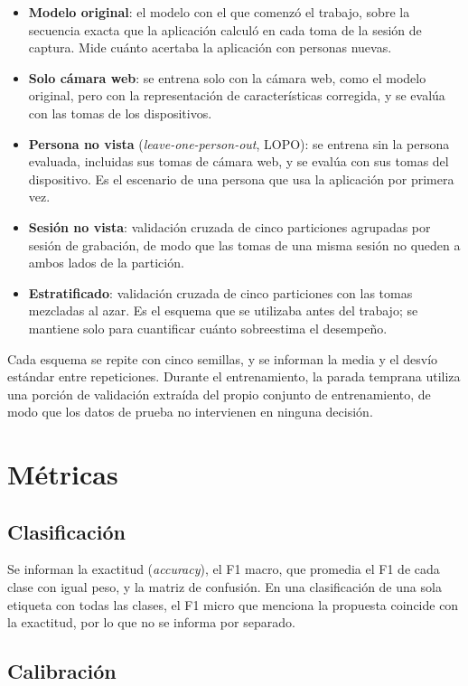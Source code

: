 \begin{itemize}
    \item \textbf{Modelo original}: el modelo con el que comenzó el trabajo, sobre la secuencia exacta que la aplicación calculó en cada toma de la sesión de captura. Mide cuánto acertaba la aplicación con personas nuevas.
    \item \textbf{Solo cámara web}: se entrena solo con la cámara web, como el modelo original, pero con la representación de características corregida, y se evalúa con las tomas de los dispositivos.
    \item \textbf{Persona no vista} (\emph{leave-one-person-out}, LOPO): se entrena sin la persona evaluada, incluidas sus tomas de cámara web, y se evalúa con sus tomas del dispositivo. Es el escenario de una persona que usa la aplicación por primera vez.
    \item \textbf{Sesión no vista}: validación cruzada de cinco particiones agrupadas por sesión de grabación, de modo que las tomas de una misma sesión no queden a ambos lados de la partición.
    \item \textbf{Estratificado}: validación cruzada de cinco particiones con las tomas mezcladas al azar. Es el esquema que se utilizaba antes del trabajo; se mantiene solo para cuantificar cuánto sobreestima el desempeño.
\end{itemize}

Cada esquema se repite con cinco semillas, y se informan la media y el desvío estándar entre repeticiones. Durante el entrenamiento, la parada temprana utiliza una porción de validación extraída del propio conjunto de entrenamiento, de modo que los datos de prueba no intervienen en ninguna decisión.

\section{Métricas}

\subsection{Clasificación}

Se informan la exactitud (\emph{accuracy}), el F1 macro, que promedia el F1 de cada clase con igual peso, y la matriz de confusión. En una clasificación de una sola etiqueta con todas las clases, el F1 micro que menciona la propuesta coincide con la exactitud, por lo que no se informa por separado.

\subsection{Calibración}

